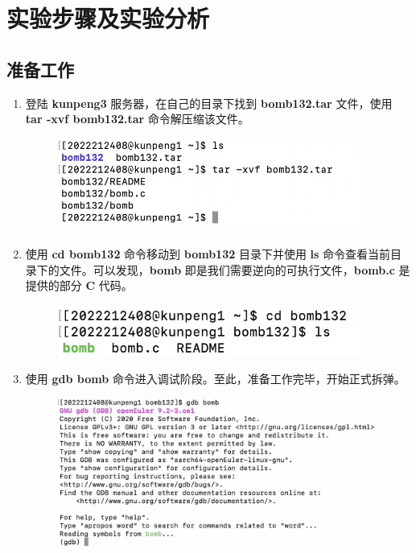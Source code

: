 \section{实验步骤及实验分析}
    \subsection{准备工作}
        \begin{enumerate}
            \item 登陆 \textbf{kunpeng3} 服务器，在自己的目录下找到 \textbf{bomb132.tar} 文件，使用 \textbf{tar -xvf bomb132.tar} 命令解压缩该文件。
                \begin{figure}[htbp]
                    \centering
                    \includegraphics*[width = 10cm]{s0_0.png}
                \end{figure}
            \item 使用 \textbf{cd bomb132} 命令移动到 \textbf{bomb132} 目录下并使用 \textbf{ls} 命令查看当前目录下的文件。可以发现，\textbf{bomb} 即是我们需要逆向的可执行文件，\textbf{bomb.c} 是提供的部分 \textbf{C} 代码。
                \begin{figure}[htbp]
                    \centering
                    \includegraphics*[width = 10cm]{s0_1.png}
                \end{figure}
            \item 使用 \textbf{gdb bomb} 命令进入调试阶段。至此，准备工作完毕，开始正式拆弹。
                \begin{figure}[htbp]
                    \centering
                    \includegraphics*[width = 12cm]{s0_2.png}
                \end{figure}
        \end{enumerate}

